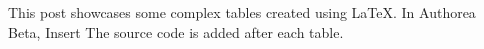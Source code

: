 This post showcases some complex tables created using LaTeX. In Authorea Beta, Insert  The source code is added after each table.

\newline